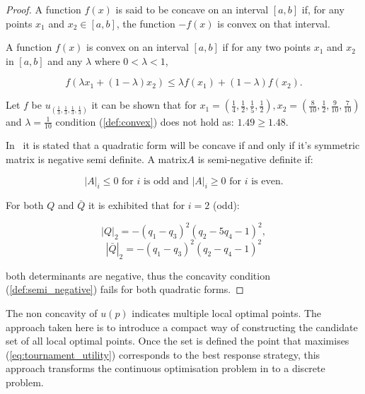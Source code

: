 \documentclass[10pt]{article}
\begin{document}
\begin{proof}
    A function \(f(x)\) is said to be concave on an interval \([a, b]\) if, for any
    points \(x_1\) and \(x_2 \in [a, b]\), the function \(-f(x)\) is convex on that
    interval.

    A function \(f(x)\) is convex on an interval \([a, b]\) if for any two
    points \(x_1\) and \(x_2\) in \([a, b]\) and any \(\lambda\) where \(0 < \lambda < 1\),

    \begin{equation}\label{def:convex}
    f (\lambda x_1 + (1 - \lambda )x_2 ) \leq \lambda f (x_1 ) + (1 - \lambda )f (x_2 ).
    \end{equation}

    Let \(f\) be
    \(u_{(\frac{1}{3}, \frac{1}{3}, \frac{1}{3}, \frac{1}{3})}\) it can be shown
    that
    for \(x_1 = (\frac{1}{4}, \frac{1}{2}, \frac{1}{5} , \frac{1}{2}),
    x_2 = (\frac{8}{10}, \frac{1}{2}, \frac{9}{10} , \frac{7}{10})\) and
    \(\lambda=\frac{1}{10}\)
    condition (\ref{def:convex}) does not hold as: \(1.49 \geq 1.48\).

    In~\cite{Anton2014} it is stated that a quadratic form will
    be concave if and only if it's symmetric matrix is negative semi definite.
    A matrix\(A\) is semi-negative definite if:

    \begin{equation}\label{def:semi_negative}
    |A|_i \leq 0 \text{ for } i \text{ is odd and } |A|_i \geq 0  \text{ for } i
    \text{ is even.}
    \end{equation}

    For both \(Q\) and \(\bar{Q}\) it is exhibited that for \(i=2\) (odd):

    \[|Q|_2 = - \left(q_{1} - q_{3}\right)^{2} \left(q_{2} - 5 q_{4} - 1\right)^{2},\]
    \[|\bar{Q}|_2 =- \left(q_{1} - q_{3}\right)^{2} \left(q_{2} - q_{4} - 1\right)^{2}\]

    both determinants are negative, thus the concavity condition
    (\ref{def:semi_negative})
    fails for both quadratic forms.
\end{proof}

The non concavity of \(u(p)\) indicates multiple local optimal points.
The approach taken here is to introduce a compact way of constructing
the candidate set of all local optimal points. Once
the set is defined the point that maximises (\ref{eq:tournament_utility})
corresponds to the best response strategy, this approach transforms the
continuous optimisation problem in to a discrete problem.
\end{document}
